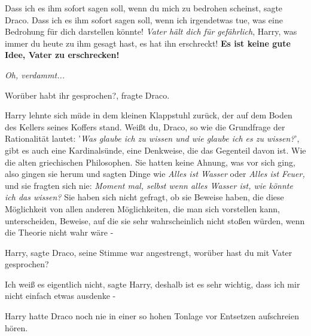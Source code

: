 \glqq{}Dass ich es ihm sofort sagen soll, wenn du mich zu bedrohen
scheinst\grqq{}, sagte Draco. \glqq{}Dass ich es ihm sofort sagen soll, wenn ich
irgendetwas tue, was eine Bedrohung für dich darstellen könnte! \emph{Vater hält
dich für gefährlich}, Harry, was immer du heute zu ihm gesagt hast, es hat ihn
erschreckt! \textbf{Es ist keine gute Idee, Vater zu erschrecken!}\grqq{}

\emph{Oh, verdammt...}

\glqq{}Worüber habt ihr gesprochen?\grqq{}, fragte Draco.

Harry lehnte sich müde in dem kleinen Klappstuhl zurück, der auf dem Boden des
Kellers seines Koffers stand. \glqq{}Weißt du, Draco, so wie die Grundfrage der
Rationalität lautet: '\emph{Was glaube ich zu wissen und wie glaube ich es zu
wissen?}', gibt es auch eine Kardinalsünde, eine Denkweise, die das Gegenteil
davon ist. Wie die alten griechischen Philosophen. Sie hatten keine Ahnung, was
vor sich ging, also gingen sie herum und sagten Dinge wie \emph{\glqq{}Alles ist
Wasser\grqq{}} oder \emph{\glqq{}Alles ist Feuer\grqq{},} und sie fragten sich
nie:\emph{ \glqq{}Moment mal, selbst wenn alles Wasser ist, wie könnte ich das
wissen?} Sie haben sich nicht gefragt, ob sie Beweise haben, die diese
Möglichkeit von allen anderen Möglichkeiten, die man sich vorstellen kann,
unterscheiden, Beweise, auf die sie sehr wahrscheinlich nicht stoßen würden,
wenn die Theorie nicht wahr wäre -\grqq{}

\glqq{}Harry\grqq{}, sagte Draco, seine Stimme war angestrengt, \glqq{}worüber
hast du mit Vater gesprochen?\grqq{}

\glqq{}Ich weiß es eigentlich nicht\grqq{}, sagte Harry, \glqq{}deshalb ist es
sehr wichtig, dass ich mir nicht einfach etwas ausdenke -\grqq{}

Harry hatte Draco noch nie in einer so hohen Tonlage vor Entsetzen aufschreien
hören.

